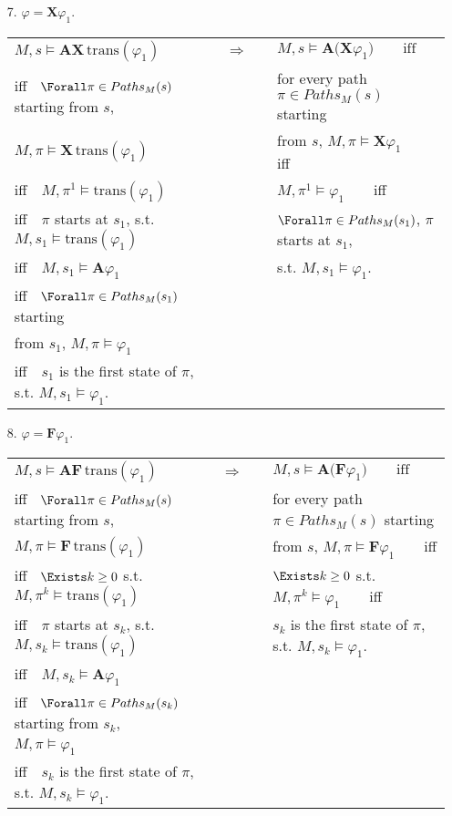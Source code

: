 {\begin{enumerate}
\item[7.] $\varphi =\mathbf{X}\varphi _{1}.$

\begin{tabular}{lcl}
$M,s\vDash \mathbf{AX}\,\mathrm{trans}(\varphi _{1})$ & $\quad \Rightarrow
\quad $ & $M,s\vDash \mathbf{A(X}\varphi _{1})\qquad \text{iff}$ \\ 
iff$\quad \Forall\pi \in Paths_{M}(s)$ starting from $s$, &  & for every
path $\pi \in Paths_{M}(s)$ starting \\ 
$M,\pi \vDash \mathbf{X}\,\mathrm{trans}(\varphi _{1})$ &  &  from $s$, $%
M,\pi \vDash \mathbf{X}\varphi _{1}\qquad $iff \\ 
iff$\quad M,\pi ^{1}\vDash \mathrm{trans}(\varphi _{1})$ &  & $M,\pi
^{1}\vDash \varphi _{1}\qquad $iff \\ 
iff$\quad \pi $ starts at $s_{1}$, s.t. $M,s_{1}\vDash \mathrm{trans}%
(\varphi _{1})$ &  & $\Forall\pi \in Paths_{M}(s_{1})$, $\pi $ starts at $%
s_{1}$, \\ 
iff$\quad M,s_{1}\vDash \mathbf{A}\varphi _{1}$ &  & s.t. $M,s_{1}\vDash
\varphi _{1}$. \\ 
iff$\quad \Forall\pi \in Paths_{M}(s_{1})$ starting &  &  \\ 
from $s_{1}$, $M,\pi \vDash \varphi _{1}$ &  &  \\ 
iff$\quad s_{1}$ is the first state of $\pi $, s.t. $M,s_{1}\vDash \varphi
_{1}$. &  & 
\end{tabular}

\item[8.] $\varphi =\mathbf{F}\varphi _{1}.$

\begin{tabular}{lcl}
$M,s\vDash \mathbf{AF}\,\mathrm{trans}(\varphi _{1})$ & $ \Rightarrow
\quad $ & $M,s\vDash \mathbf{A(F}\varphi _{1})\qquad \text{iff}$ \\ 
iff$\quad \Forall\pi \in Paths_{M}(s)$ starting from $s$, &  & for every
path $\pi \in Paths_{M}(s)$ starting \\ 
$M,\pi \vDash \mathbf{F}\,\mathrm{trans}(\varphi _{1})$ &  &  from $s$, $%
M,\pi \vDash \mathbf{F}\varphi _{1}\qquad $iff \\ 
iff$\quad \Exists k\geq 0$ s.t. $M,\pi ^{k}\vDash \mathrm{trans}(\varphi
_{1})$ &  & $\Exists k\geq 0$ s.t. $M,\pi ^{k}\vDash \varphi _{1}\qquad $iff
\\ 
iff$\quad \pi $ starts at $s_{k}$, s.t. $M,s_{k}\vDash \mathrm{trans}%
(\varphi _{1})$ &  & $s_{k}$ is the first state of $\pi $, s.t. $%
M,s_{k}\vDash \varphi _{1}$. \\ 
iff$\quad M,s_{k}\vDash \mathbf{A}\varphi _{1}$ &  &  \\ 
iff$\quad \Forall\pi \in Paths_{M}(s_{k})$ starting from $s_{k}$, &  &  \\ 
$M,\pi \vDash \varphi _{1}$ &  &  \\ 
iff$\quad s_{k}$ is the first state of $\pi $, s.t. $M,s_{k}\vDash \varphi
_{1}$. &  & 
\end{tabular}


\end{enumerate}}
